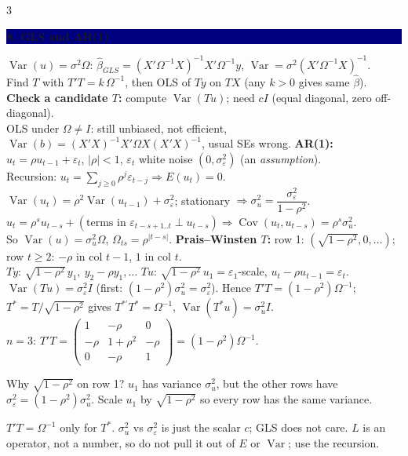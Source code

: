 \documentclass[7.5pt,landscape]{extarticle}
\newcommand{\hd}[1]{\par\vspace{3pt}\noindent\colorbox{navy}{\parbox{\dimexpr\linewidth-2\fboxsep}{\color{white}\bfseries #1}}\par\vspace{1pt}}
\newcommand{\think}[1]{\par\noindent{\color{grn}\textbf{Think:}} {\color{grn}#1}\par}
\newcommand{\warn}[1]{\par\noindent{\color{red}\textbf{Slip:}} {\color{red}#1}\par}
\newcommand{\Var}{\operatorname{Var}}\newcommand{\Cov}{\operatorname{Cov}}\newcommand{\E}{\mathbb E}
\begin{document}
\begin{multicols}{3}
\hd{8. GLS and AR(1)}
$\Var(u)=\sigma^2\Omega$: $\hat\beta_{GLS}=(X'\Omega^{-1}X)^{-1}X'\Omega^{-1}y$, $\Var=\sigma^2(X'\Omega^{-1}X)^{-1}$.\\
Find $T$ with $T'T=k\,\Omega^{-1}$, then OLS of $Ty$ on $TX$ (any $k>0$ gives same $\hat\beta$).
\textbf{Check a candidate $T$:} compute $\Var(Tu)$; need $cI$ (equal diagonal, zero off-diagonal).\\
OLS under $\Omega\ne I$: still unbiased, not efficient, $\Var(b)=(X'X)^{-1}X'\Omega X(X'X)^{-1}$, usual SEs wrong.
\textbf{AR(1):} $u_t=\rho u_{t-1}+\varepsilon_t$, $|\rho|<1$, $\varepsilon_t$ white noise $(0,\sigma_\varepsilon^2)$ (an \emph{assumption}).\\
Recursion: $u_t=\sum_{j\ge0}\rho^j\varepsilon_{t-j}\Rightarrow E(u_t)=0$.\\
$\Var(u_t)=\rho^2\Var(u_{t-1})+\sigma_\varepsilon^2$; stationary $\Rightarrow\sigma_u^2=\dfrac{\sigma_\varepsilon^2}{1-\rho^2}$.\\
$u_t=\rho^su_{t-s}+(\text{terms in }\varepsilon_{t-s+1..t}\perp u_{t-s})\Rightarrow\Cov(u_t,u_{t-s})=\rho^s\sigma_u^2$.\\
So $\Var(u)=\sigma_u^2\Omega$, $\Omega_{ts}=\rho^{|t-s|}$.
\textbf{Prais--Winsten $T$:} row 1: $(\sqrt{1-\rho^2},0,\dots)$; row $t\ge2$: $-\rho$ in col $t-1$, $1$ in col $t$.\\
$Ty$: $\sqrt{1-\rho^2}\,y_1,\ y_2-\rho y_1,\dots$ \quad $Tu$: $\sqrt{1-\rho^2}\,u_1=\varepsilon_1$-scale, $u_t-\rho u_{t-1}=\varepsilon_t$.\\
$\Var(Tu)=\sigma_\varepsilon^2I$ (first: $(1-\rho^2)\sigma_u^2=\sigma_\varepsilon^2$). Hence $T'T=(1-\rho^2)\Omega^{-1}$; $T^*=T/\sqrt{1-\rho^2}$ gives $T^{*\prime}T^*=\Omega^{-1}$, $\Var(T^*u)=\sigma_u^2I$.\\
$n=3$: $T'T=\begin{pmatrix}1&-\rho&0\\-\rho&1+\rho^2&-\rho\\0&-\rho&1\end{pmatrix}=(1-\rho^2)\Omega^{-1}$.
\think{Why $\sqrt{1-\rho^2}$ on row 1? $u_1$ has variance $\sigma_u^2$, but the other rows have $\sigma_\varepsilon^2=(1-\rho^2)\sigma_u^2$. Scale $u_1$ by $\sqrt{1-\rho^2}$ so every row has the same variance.}
\warn{$T'T=\Omega^{-1}$ only for $T^*$. $\sigma_u^2$ vs $\sigma_\varepsilon^2$ is just the scalar $c$; GLS does not care. $L$ is an operator, not a number, so do not pull it out of $E$ or $\Var$; use the recursion.}


\end{multicols}
\end{document}

